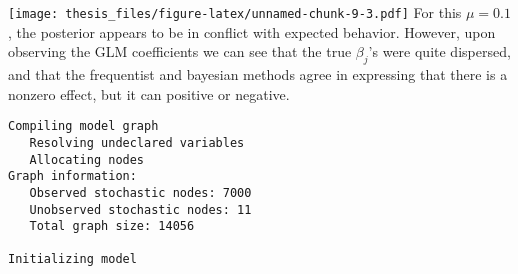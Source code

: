 \documentclass[12pt,twoside]{dukestatscithesis}
\theoremstyle{definition}
\theoremstyle{definition}
\theoremstyle{definition}
\theoremstyle{remark}
\begin{document}
\begin{Shaded}
\begin{Highlighting}[]
\StringTok{ }\OperatorTok{~}\StringTok{ }\NormalTok{, }

\NormalTok{(}\NormalTok{)}
\NormalTok{(}\NormalTok{(}\NormalTok{,}\NormalTok{),}\NormalTok{(}\NormalTok{,}\NormalTok{))}
\end{Highlighting}
\end{Shaded}
\texttt{[image: thesis\_files/figure-latex/unnamed-chunk-9-3.pdf]} For
this \(\mu= 0.1\), the posterior appears to be in conflict with expected
behavior. However, upon observing the GLM coefficients we can see that
the true \(\beta_j\)'s were quite dispersed, and that the frequentist
and bayesian methods agree in expressing that there is a nonzero effect,
but it can positive or negative.
\begin{Shaded}
\begin{Highlighting}[]
\StringTok{ }\NormalTok{(}
                    \NormalTok{, }\NormalTok{(}\NormalTok{, }\NormalTok{, }\NormalTok{,}\NormalTok{,}\NormalTok{,}\NormalTok{,}\NormalTok{),}
\end{Highlighting}
\end{Shaded}
\begin{verbatim}
Compiling model graph
   Resolving undeclared variables
   Allocating nodes
Graph information:
   Observed stochastic nodes: 7000
   Unobserved stochastic nodes: 11
   Total graph size: 14056

Initializing model
\end{verbatim}
\begin{Shaded}
\begin{Highlighting}[]
\OperatorTok{$}\OperatorTok{$}\OperatorTok{$}
\end{Highlighting}
\end{Shaded}
\end{document}
